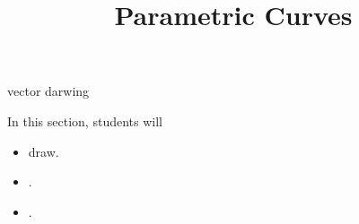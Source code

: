 \documentclass{ximera}
\title{Parametric Curves}
\begin{document}
\begin{abstract}
%
\end{abstract}
\maketitle




vector darwing

\begin{sectionOutcomes}
In this section, students will 

\begin{itemize}
\item draw.
\item .
\item .
\end{itemize}
\end{sectionOutcomes}
\end{document}
